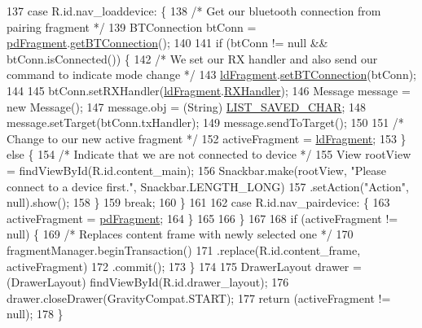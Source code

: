 \begin{DoxyCode}
137             \textcolor{keywordflow}{case} R.id.nav\_loaddevice: \{
138                 \textcolor{comment}{/* Get our bluetooth connection from pairing fragment */}
139                 BTConnection btConn = \hyperlink{classcom_1_1jack_1_1motorbikestatistics_1_1_main_activity_a2802ad16b5fdba42834d1b31e255dd96}{pdFragment}.\hyperlink{classcom_1_1jack_1_1motorbikestatistics_1_1_pair_device_fragment_a32debe1358d94bb1c972137f60d1aa36}{getBTConnection}();
140 
141                 \textcolor{keywordflow}{if} (btConn != null && btConn.isConnected()) \{
142                     \textcolor{comment}{/* We set our RX handler and also send our command to indicate mode change */}
143                     \hyperlink{classcom_1_1jack_1_1motorbikestatistics_1_1_main_activity_ac2ac0c852d3352efd6368ee550ef3c3c}{ldFragment}.\hyperlink{classcom_1_1jack_1_1motorbikestatistics_1_1_load_device_fragment_aec66dc5fd944098de78ace4175fca5b6}{setBTConnection}(btConn);
144 
145                     btConn.setRXHandler(\hyperlink{classcom_1_1jack_1_1motorbikestatistics_1_1_main_activity_ac2ac0c852d3352efd6368ee550ef3c3c}{ldFragment}.\hyperlink{classcom_1_1jack_1_1motorbikestatistics_1_1_load_device_fragment_a7c26c8686c290d8766b051f31473d716}{RXHandler});
146                     Message message = \textcolor{keyword}{new} Message();
147                     message.obj = (String) \hyperlink{classcom_1_1jack_1_1motorbikestatistics_1_1_main_activity_a853e8df63cac245f60ef82edaaa7ee31}{LIST\_SAVED\_CHAR};
148                     message.setTarget(btConn.txHandler);
149                     message.sendToTarget();
150 
151                     \textcolor{comment}{/* Change to our new active fragment */}
152                     activeFragment = \hyperlink{classcom_1_1jack_1_1motorbikestatistics_1_1_main_activity_ac2ac0c852d3352efd6368ee550ef3c3c}{ldFragment};
153                 \} \textcolor{keywordflow}{else} \{
154                     \textcolor{comment}{/* Indicate that we are not connected to device */}
155                     View rootView = findViewById(R.id.content\_main);
156                     Snackbar.make(rootView, \textcolor{stringliteral}{"Please connect to a device first."}, Snackbar.LENGTH\_LONG)
157                             .setAction(\textcolor{stringliteral}{"Action"}, null).show();
158                 \}
159                 \textcolor{keywordflow}{break};
160             \}
161 
162             \textcolor{keywordflow}{case} R.id.nav\_pairdevice: \{
163                 activeFragment = \hyperlink{classcom_1_1jack_1_1motorbikestatistics_1_1_main_activity_a2802ad16b5fdba42834d1b31e255dd96}{pdFragment};
164             \}
165 
166         \}
167 
168         \textcolor{keywordflow}{if} (activeFragment != null) \{
169             \textcolor{comment}{/* Replaces content frame with newly selected one */}
170             fragmentManager.beginTransaction()
171                     .replace(R.id.content\_frame, activeFragment)
172                     .commit();
173         \}
174 
175         DrawerLayout drawer = (DrawerLayout) findViewById(R.id.drawer\_layout);
176         drawer.closeDrawer(GravityCompat.START);
177         \textcolor{keywordflow}{return} (activeFragment != null);
178     \}
\end{DoxyCode}


